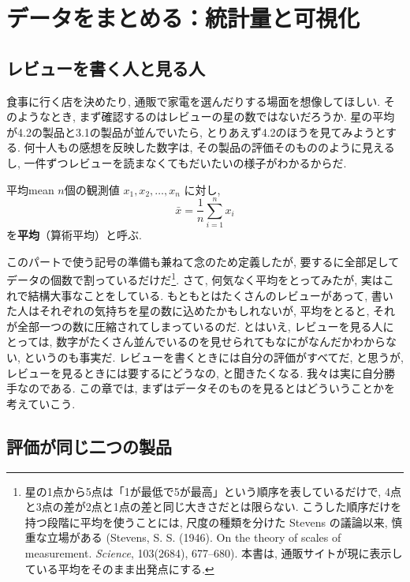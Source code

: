 \section{データをまとめる：統計量と可視化}

  \subsection{レビューを書く人と見る人}

    食事に行く店を決めたり, 通販で家電を選んだりする場面を想像してほしい. 
    そのようなとき, まず確認するのはレビューの星の数ではないだろうか.
    星の平均が4.2の製品と3.1の製品が並んでいたら, とりあえず4.2のほうを見てみようとする.
    何十人もの感想を反映した数字は, その製品の評価そのもののように見えるし, 
    一件ずつレビューを読まなくてもだいたいの様子がわかるからだ.

    \begin{defi}{平均}{mean}
      $n$個の観測値 $x_1, x_2, \ldots, x_n$ に対し,
      \[
        \bar{x} = \frac{1}{n} \sum_{i=1}^{n} x_i
      \]
      を\textbf{平均}（算術平均）と呼ぶ.
    \end{defi}

    このパートで使う記号の準備も兼ねて念のため定義したが, 要するに全部足してデータの個数で割っているだけだ\footnote{%
    星の1点から5点は「1が最低で5が最高」という順序を表しているだけで, 4点と3点の差が2点と1点の差と同じ大きさだとは限らない.
    こうした順序だけを持つ段階に平均を使うことには, 尺度の種類を分けた Stevens の議論以来, 慎重な立場がある (Stevens, S. S. (1946). On the theory of scales of measurement. \textit{Science}, 103(2684), 677--680).
    本書は, 通販サイトが現に表示している平均をそのまま出発点にする.}.
    さて, 何気なく平均をとってみたが, 実はこれで結構大事なことをしている.
    もともとはたくさんのレビューがあって, 書いた人はそれぞれの気持ちを星の数に込めたかもしれないが,
    平均をとると, それが全部一つの数に圧縮されてしまっているのだ.
    とはいえ, レビューを見る人にとっては, 数字がたくさん並んでいるのを見せられてもなにがなんだかわからない, というのも事実だ.
    レビューを書くときには自分の評価がすべてだ, と思うが, レビューを見るときには要するにどうなの, と聞きたくなる. 
    我々は実に自分勝手なのである. 
    この章では, まずはデータそのものを見るとはどういうことかを考えていこう. 

  \subsection{評価が同じ二つの製品}    

